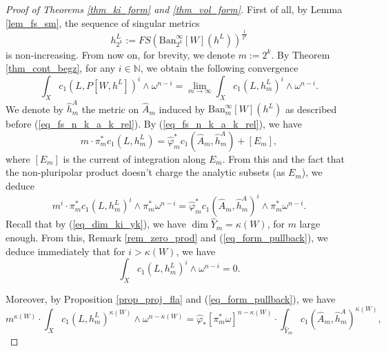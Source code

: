 \documentclass[12pt]{article}
\numberwithin{equation}{section}
\theoremstyle{theorem}
\theoremstyle{definition}
\theoremstyle{remark}
\newcommand{\nat}{\mathbb{N}}
\begin{document}
	\begin{proof}[Proof of Theorems \ref{thm_ki_form} and \ref{thm_vol_form}]
		First of all, by Lemma \ref{lem_fs_sm}, the sequence of singular metrics
		\begin{equation}
			h^L_{2^k}
			:=
			FS({\textrm{Ban}}_{2^k}^{\infty}[W](h^L))^{\frac{1}{2^k}}
		\end{equation}
		is non-increasing.
		From now on, for brevity, we denote $m := 2^k$.
		By Theorem \ref{thm_cont_begz}, for any $i \in \nat$, we obtain the following convergence
		\begin{equation}
			\int_X c_1(L, P[W, h^L])^{i} \wedge \omega^{n - i}
			=
			\lim_{m \to \infty} \int_X c_1(L, h^L_m)^{i} \wedge \omega^{n - i}.
		\end{equation}
		We denote by $\widehat{h}^A_m$ the metric on $\widehat{A}_{m}$ induced by ${\textrm{Ban}}_{m}^{\infty}[W](h^L)$ as described before (\ref{eq_fs_n_k_a_k_rel}).
		By (\ref{eq_fs_n_k_a_k_rel}), we have
		\begin{equation}
			m \cdot \pi_m^* c_1(L, h^L_m)
			=
			\widehat{\varphi}_{m}^* c_1(\widehat{A}_{m}, \widehat{h}^A_m)
			+
			[E_m],
		\end{equation}
		where $[E_m]$ is the current of integration along $E_m$.
		From this and the fact that the non-pluripolar product doesn't charge the analytic subsets (as $E_m$), we deduce 
		\begin{equation}\label{eq_form_pullback}
			m^i \cdot \pi_m^* c_1(L, h^L_m)^{i} \wedge \pi_m^* \omega^{n - i}
			=
			\widehat{\varphi}_m^* c_1(\widehat{A}_m, \widehat{h}^A_m)^{i} \wedge \pi_m^* \omega^{n - i}.
		\end{equation}
		Recall that by (\ref{eq_dim_ki_yk}), we have $\dim \widehat{Y}_m = \kappa(W)$, for $m$ large enough.
		From this, Remark \ref{rem_zero_prod} and (\ref{eq_form_pullback}), we deduce immediately that for $i > \kappa(W)$, we have
		\begin{equation}\label{eq_i_big_zero}
			\int_X c_1(L, h^L_m)^{i} \wedge \omega^{n - i}
			=
			0.
		\end{equation}
		\par 
		Moreover, by Proposition \ref{prop_proj_fla} and (\ref{eq_form_pullback}), we have
		\begin{equation}\label{eq_int_l_a_id}
			m^{\kappa(W)} \cdot \int_X c_1(L, h^L_m)^{\kappa(W)} \wedge \omega^{n - \kappa(W)}
			=
			\widehat{\varphi}_{*}[ \pi_m^* \omega]^{n - \kappa(W)}
			\cdot
			\int_{\widehat{Y}_m} c_1(\widehat{A}_m, \widehat{h}^A_m)^{\kappa(W)},
		\end{equation}

\end{proof}
\end{document}
